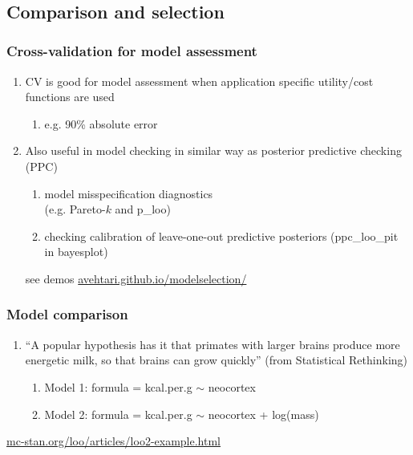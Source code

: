 \documentclass[10pt]{beamer}
\begin{document}
\begin{frame}{}
  \\

\end{frame}

\subsection{Comparison and selection}

\begin{frame}{}

\frametitle{Cross-validation for model assessment}

\begin{enumerate}
\item CV is good for model assessment when application specific utility/cost functions are used
  \begin{enumerate}
  \item e.g. 90\% absolute error
  \end{enumerate}
\item<2-> Also useful in model checking in similar way as posterior
  predictive checking (PPC)
  \begin{enumerate}
  \item model misspecification diagnostics\\ (e.g. Pareto-$k$ and p\_loo)
  \item checking calibration of leave-one-out predictive posteriors
    (ppc\_loo\_pit in bayesplot)
  \end{enumerate}
  {\small see demos \url{avehtari.github.io/modelselection/}}
\end{enumerate}

\end{frame}



 \begin{frame}{}

 \frametitle{ Model comparison}

 \begin{enumerate}
 \item ``A popular hypothesis has it that primates with larger brains
   produce more energetic milk, so that brains can grow quickly'' (from
   Statistical Rethinking)
   \begin{enumerate}
     \item Model 1: formula = kcal.per.g $\sim$ neocortex
     \item Model 2: formula = kcal.per.g $\sim$ neocortex + log(mass)
   \end{enumerate}
 \end{enumerate}

 \vspace{10\baselineskip}
 {\small \url{mc-stan.org/loo/articles/loo2-example.html}}

 \end{frame}
\end{document}
